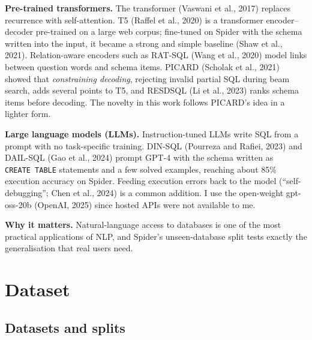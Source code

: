 \documentclass[
  10pt,
]{article}
\begin{document}
\textbf{Pre-trained transformers.} The transformer (Vaswani et al.,
2017) replaces recurrence with self-attention. T5 (Raffel et al., 2020)
is a transformer encoder--decoder pre-trained on a large web corpus;
fine-tuned on Spider with the schema written into the input, it became a
strong and simple baseline (Shaw et al., 2021). Relation-aware encoders
such as RAT-SQL (Wang et al., 2020) model links between question words
and schema items. PICARD (Scholak et al., 2021) showed that
\emph{constraining decoding}, rejecting invalid partial SQL during beam
search, adds several points to T5, and RESDSQL (Li et al., 2023) ranks
schema items before decoding. The novelty in this work follows PICARD's
idea in a lighter form.

\textbf{Large language models (LLMs).} Instruction-tuned LLMs write SQL
from a prompt with no task-specific training. DIN-SQL (Pourreza and
Rafiei, 2023) and DAIL-SQL (Gao et al., 2024) prompt GPT-4 with the
schema written as \texttt{CREATE\ TABLE} statements and a few solved
examples, reaching about 85\% execution accuracy on Spider. Feeding
execution errors back to the model (``self-debugging''; Chen et al.,
2024) is a common addition. I use the open-weight gpt-oss-20b (OpenAI,
2025) since hosted APIs were not available to me.

\textbf{Why it matters.} Natural-language access to databases is one of
the most practical applications of NLP, and Spider's unseen-database
split tests exactly the generalisation that real users need.

\section{Dataset}\label{dataset}

\subsection{Datasets and splits}\label{datasets-and-splits}
\end{document}
